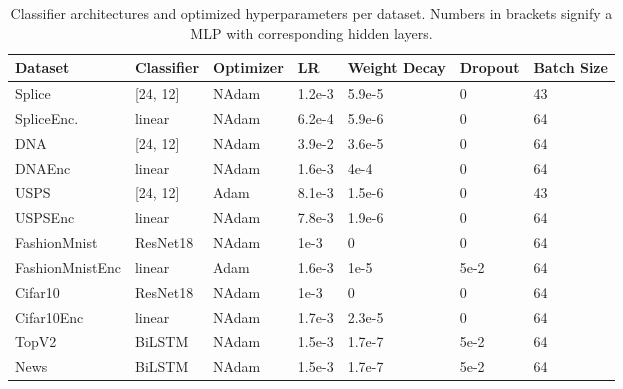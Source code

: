 \documentclass[]{article}
\begin{document}
\begin{table}[H]
	\centering
	\begin{tabular}{l || l | l l l l l}
		Dataset & Classifier & Optimizer & LR & Weight Decay & Dropout & Batch Size \\
		\hline
		Splice & [24, 12] & NAdam & 1.2e-3 & 5.9e-5 & 0 & 43 \\
		SpliceEnc. & linear & NAdam & 6.2e-4 & 5.9e-6 & 0 & 64 \\
		DNA & [24, 12] & NAdam & 3.9e-2 & 3.6e-5 & 0 & 64 \\
		DNAEnc & linear & NAdam & 1.6e-3 & 4e-4 & 0 & 64 \\
		USPS & [24, 12] & Adam & 8.1e-3 & 1.5e-6 & 0 & 43 \\
		USPSEnc & linear & NAdam & 7.8e-3 & 1.9e-6 & 0 & 64 \\
		FashionMnist & ResNet18 & NAdam & 1e-3 & 0 & 0 & 64 \\
		FashionMnistEnc & linear & Adam & 1.6e-3 & 1e-5 & 5e-2 & 64 \\
		Cifar10 & ResNet18 & NAdam & 1e-3 & 0 & 0 & 64 \\
		Cifar10Enc & linear & NAdam & 1.7e-3 & 2.3e-5 & 0 & 64 \\
		TopV2 & BiLSTM & NAdam & 1.5e-3 & 1.7e-7 & 5e-2 & 64 \\
		News & BiLSTM & NAdam & 1.5e-3 & 1.7e-7 & 5e-2 & 64 \\
	\end{tabular}
	\caption{Classifier architectures and optimized hyperparameters per dataset. Numbers in brackets signify a MLP with corresponding hidden layers.}
	\label{tab:architectures}
\end{table}



\end{document}
